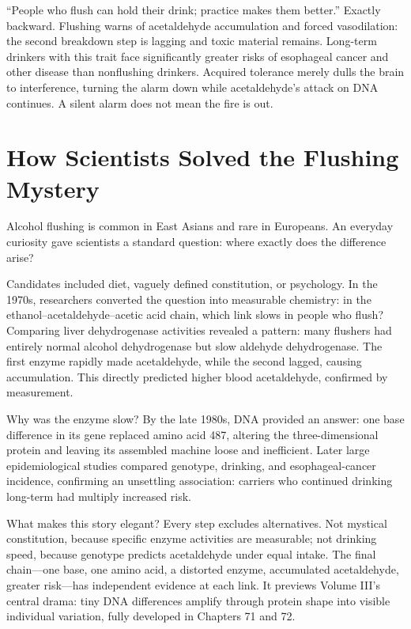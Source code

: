 \begin{wuqu}
``People who flush can hold their drink; practice makes them better.'' Exactly backward. Flushing warns of acetaldehyde accumulation and forced vasodilation: the second breakdown step is lagging and toxic material remains. Long-term drinkers with this trait face significantly greater risks of esophageal cancer and other disease than nonflushing drinkers. Acquired tolerance merely dulls the brain to interference, turning the alarm down while acetaldehyde's attack on DNA continues. A silent alarm does not mean the fire is out.
\end{wuqu}

\section{How Scientists Solved the Flushing Mystery}

\begin{zhengju}
Alcohol flushing is common in East Asians and rare in Europeans. An everyday curiosity gave scientists a standard question: where exactly does the difference arise?

Candidates included diet, vaguely defined constitution, or psychology. In the 1970s, researchers converted the question into measurable chemistry: in the ethanol--acetaldehyde--acetic acid chain, which link slows in people who flush? Comparing liver dehydrogenase activities revealed a pattern: many flushers had entirely normal alcohol dehydrogenase but slow aldehyde dehydrogenase. The first enzyme rapidly made acetaldehyde, while the second lagged, causing accumulation. This directly predicted higher blood acetaldehyde, confirmed by measurement.

Why was the enzyme slow? By the late 1980s, DNA provided an answer: one base difference in its gene replaced amino acid 487, altering the three-dimensional protein and leaving its assembled machine loose and inefficient. Later large epidemiological studies compared genotype, drinking, and esophageal-cancer incidence, confirming an unsettling association: carriers who continued drinking long-term had multiply increased risk.

What makes this story elegant? Every step excludes alternatives. Not mystical constitution, because specific enzyme activities are measurable; not drinking speed, because genotype predicts acetaldehyde under equal intake. The final chain---one base, one amino acid, a distorted enzyme, accumulated acetaldehyde, greater risk---has independent evidence at each link. It previews Volume III's central drama: tiny DNA differences amplify through protein shape into visible individual variation, fully developed in Chapters 71 and 72.
\end{zhengju}

